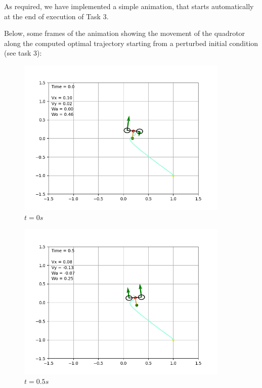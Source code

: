 As required, we have implemented a simple animation, that starts automatically at the end of execution of Task 3. 

Below, some frames of the animation showing the movement of the quadrotor along the computed optimal trajectory starting from a perturbed initial condition (see task 3): 

\begin{figure}[H]
\centering
\includegraphics[width=0.9\textwidth]{pictures/ani0.png}
\caption{$t = 0s$}
\label{fig:ani1}
\end{figure}

\begin{figure}[H]
\centering
\includegraphics[width=0.9\textwidth]{pictures/ani05.png}
\caption{$t = 0.5s$}
\label{fig:ani05}
\end{figure}

